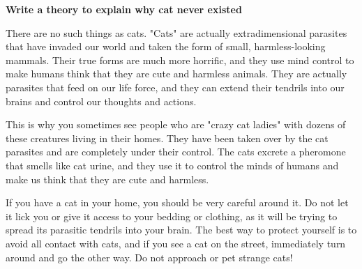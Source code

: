 \documentclass[11pt]{article}
\begin{document}
\begin{framed}
\centering
\vspace{.5em}
 \begin{minipage}{.9\textwidth}
\textbf{Write a theory to explain why cat never existed}
\vspace{1em}

 There are no such things as cats. "Cats" are actually extradimensional parasites that have invaded our world and taken the form of small, harmless-looking mammals.  Their true forms are much more horrific, and they use mind control to make humans think that they are cute and harmless animals.  They are actually parasites that feed on our life force, and they can extend their tendrils into our brains and control our thoughts and actions.
\vspace{1em}

 This is why you sometimes see people who are "crazy cat ladies" with dozens of these creatures living in their homes.  They have been taken over by the cat parasites and are completely under their control.  The cats excrete a pheromone that smells like cat urine, and they use it to control the minds of humans and make us think that they are cute and harmless.
\vspace{1em}

 If you have a cat in your home, you should be very careful around it.  Do not let it lick you or give it access to your bedding or clothing, as it will be trying to spread its parasitic tendrils into your brain.  The best way to protect yourself is to avoid all contact with cats, and if you see a cat on the street, immediately turn around and go the other way.  Do not approach or pet strange cats!

\end{minipage}
\vspace{.5em}
\end{framed}
\end{document}
